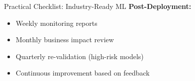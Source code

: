 \begin{frame}{Practical Checklist: Industry-Ready ML}
\vspace{0.3cm}
\textbf{Post-Deployment:}
\begin{itemize}
\item[$\square$] Weekly monitoring reports
\item[$\square$] Monthly business impact review
\item[$\square$] Quarterly re-validation (high-risk models)
\item[$\square$] Continuous improvement based on feedback
\end{itemize}
\end{frame}

